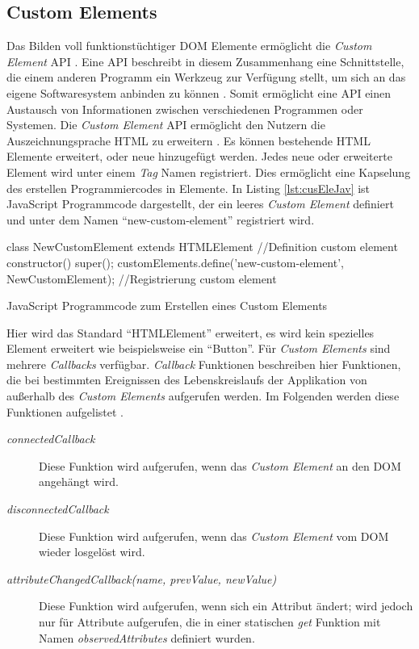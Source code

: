 \documentclass[12pt, paper=a4, bibtotoc, toc=listof, headsepline=true, numbers=endperiod]{scrreprt}
\begin{document}
		\subsection{Custom Elements}
		Das Bilden voll funktionstüchtiger \ac{DOM} Elemente ermöglicht die \emph{Custom Element} \ac{API} \cite{Denicola2016}. Eine \ac{API} beschreibt in diesem Zusammenhang eine Schnittstelle, die einem anderen Programm ein Werkzeug zur Verfügung stellt, um sich an das eigene Softwaresystem anbinden zu können \cite{Behrendt2016}. Somit ermöglicht eine \ac{API} einen Austausch von Informationen zwischen verschiedenen Programmen oder Systemen.	
		Die \emph{Custom Element} \ac{API} ermöglicht den Nutzern die Auszeichnungsprache \ac{HTML} zu erweitern \cite{Argelius2016}. Es können bestehende \ac{HTML} Elemente erweitert, oder neue hinzugefügt werden. Jedes neue oder erweiterte Element wird unter einem \emph{Tag} Namen registriert. Dies ermöglicht eine Kapselung des erstellen Programmiercodes in Elemente. In Listing \ref{lst:cusEleJav} ist JavaScript Programmcode dargestellt, der ein leeres \emph{Custom Element} definiert und unter dem Namen \enquote{new-custom-element} registriert wird.
		\begin{listing}[H]
			\begin{JavaScriptcode*}{}
class NewCustomElement extends HTMLElement { //Definition custom element
	constructor() {
		super();
	}
}
customElements.define('new-custom-element', NewCustomElement); //Registrierung custom element
			\end{JavaScriptcode*}
			\caption[Erstellung Custom Element]{JavaScript Programmcode zum Erstellen eines Custom Elements}
			\label{lst:cusEleJav}
		\end{listing}\noindent
		Hier wird das Standard \enquote{HTMLElement} erweitert, es wird kein spezielles Element erweitert wie beispielsweise ein \enquote{Button}.
		Für \emph{Custom Elements} sind mehrere \emph{Callbacks} verfügbar. \emph{Callback} Funktionen beschreiben hier Funktionen, die bei bestimmten Ereignissen des Lebenskreislaufs der Applikation von außerhalb des \emph{Custom Elements} aufgerufen werden. Im Folgenden werden diese Funktionen aufgelistet \cite{Argelius2016}.
		\begin{description}  
			\item  [\emph{connectedCallback}] Diese Funktion wird aufgerufen, wenn das \emph{Custom Element} an den \ac{DOM} angehängt wird.			
			\item [\emph{disconnectedCallback}] Diese Funktion wird aufgerufen, wenn das \emph{Custom Element} vom \ac{DOM} wieder losgelöst wird. 			
			\item  [\emph{attributeChangedCallback(name, prevValue, newValue)}] Diese Funktion wird aufgerufen, wenn sich ein Attribut ändert; wird jedoch nur für Attribute aufgerufen, die in einer statischen \emph{get} Funktion mit Namen \emph{observedAttributes} definiert wurden.
		\end{description}
\end{document}

